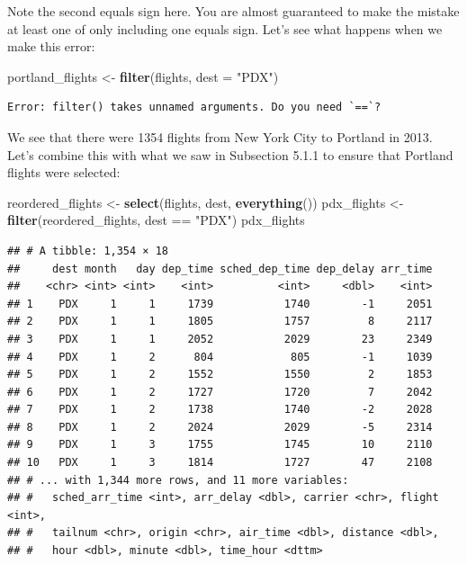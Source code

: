 \documentclass[]{tufte-book}
\newenvironment{Shaded}{\begin{snugshade}}{\end{snugshade}}
\newcommand{\KeywordTok}[1]{\textcolor[rgb]{0.13,0.29,0.53}{\textbf{{#1}}}}
\newcommand{\DataTypeTok}[1]{\textcolor[rgb]{0.13,0.29,0.53}{{#1}}}
\newcommand{\StringTok}[1]{\textcolor[rgb]{0.31,0.60,0.02}{{#1}}}
\newcommand{\NormalTok}[1]{{#1}}
\begin{document}
Note the second equals sign here. You are almost guaranteed to make the
mistake at least one of only including one equals sign. Let's see what
happens when we make this error:

\begin{Shaded}
\begin{Highlighting}[]
\NormalTok{portland_flights <-}\StringTok{ }\KeywordTok{filter}\NormalTok{(flights, }\DataTypeTok{dest =} \StringTok{"PDX"}\NormalTok{)}
\end{Highlighting}
\end{Shaded}

\begin{verbatim}
Error: filter() takes unnamed arguments. Do you need `==`?
\end{verbatim}

We see that there were 1354 flights from New York City to Portland in
2013. Let's combine this with what we saw in Subsection 5.1.1 to ensure
that Portland flights were selected:

\begin{Shaded}
\begin{Highlighting}[]
\NormalTok{reordered_flights <-}\StringTok{ }\KeywordTok{select}\NormalTok{(flights, dest, }\KeywordTok{everything}\NormalTok{())}
\NormalTok{pdx_flights <-}\StringTok{ }\KeywordTok{filter}\NormalTok{(reordered_flights, dest ==}\StringTok{ "PDX"}\NormalTok{)}
\NormalTok{pdx_flights}
\end{Highlighting}
\end{Shaded}

\begin{verbatim}
## # A tibble: 1,354 × 18
##     dest month   day dep_time sched_dep_time dep_delay arr_time
##    <chr> <int> <int>    <int>          <int>     <dbl>    <int>
## 1    PDX     1     1     1739           1740        -1     2051
## 2    PDX     1     1     1805           1757         8     2117
## 3    PDX     1     1     2052           2029        23     2349
## 4    PDX     1     2      804            805        -1     1039
## 5    PDX     1     2     1552           1550         2     1853
## 6    PDX     1     2     1727           1720         7     2042
## 7    PDX     1     2     1738           1740        -2     2028
## 8    PDX     1     2     2024           2029        -5     2314
## 9    PDX     1     3     1755           1745        10     2110
## 10   PDX     1     3     1814           1727        47     2108
## # ... with 1,344 more rows, and 11 more variables:
## #   sched_arr_time <int>, arr_delay <dbl>, carrier <chr>, flight <int>,
## #   tailnum <chr>, origin <chr>, air_time <dbl>, distance <dbl>,
## #   hour <dbl>, minute <dbl>, time_hour <dttm>
\end{verbatim}
\end{document}
